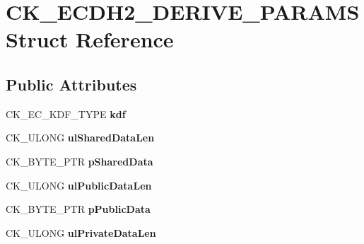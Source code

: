 \hypertarget{struct_c_k___e_c_d_h2___d_e_r_i_v_e___p_a_r_a_m_s}{}\section{C\+K\+\_\+\+E\+C\+D\+H2\+\_\+\+D\+E\+R\+I\+V\+E\+\_\+\+P\+A\+R\+A\+MS Struct Reference}
\label{struct_c_k___e_c_d_h2___d_e_r_i_v_e___p_a_r_a_m_s}
\subsection*{Public Attributes}
\begin{DoxyCompactItemize}
\item 
\mbox{\label{struct_c_k___e_c_d_h2___d_e_r_i_v_e___p_a_r_a_m_s_a202b6935c7bbec17e822dfb2d917c97d}} 
C\+K\+\_\+\+E\+C\+\_\+\+K\+D\+F\+\_\+\+T\+Y\+PE {\bfseries kdf}
\item 
\mbox{\label{struct_c_k___e_c_d_h2___d_e_r_i_v_e___p_a_r_a_m_s_a1a3d627d6ea0d88686f195a19413600f}} 
C\+K\+\_\+\+U\+L\+O\+NG {\bfseries ul\+Shared\+Data\+Len}
\item 
\mbox{\label{struct_c_k___e_c_d_h2___d_e_r_i_v_e___p_a_r_a_m_s_a827b60434454740b0317e9607b080d5d}} 
C\+K\+\_\+\+B\+Y\+T\+E\+\_\+\+P\+TR {\bfseries p\+Shared\+Data}
\item 
\mbox{\label{struct_c_k___e_c_d_h2___d_e_r_i_v_e___p_a_r_a_m_s_a22c377ae785c66b306ee1fe95c29ab47}} 
C\+K\+\_\+\+U\+L\+O\+NG {\bfseries ul\+Public\+Data\+Len}
\item 
\mbox{\label{struct_c_k___e_c_d_h2___d_e_r_i_v_e___p_a_r_a_m_s_ad2b01bb55ad3217666b8ce8fc6ee8f37}} 
C\+K\+\_\+\+B\+Y\+T\+E\+\_\+\+P\+TR {\bfseries p\+Public\+Data}
\item 
\mbox{\label{struct_c_k___e_c_d_h2___d_e_r_i_v_e___p_a_r_a_m_s_a0575282c7a62db5bf69a9be3b216d928}} 
C\+K\+\_\+\+U\+L\+O\+NG {\bfseries ul\+Private\+Data\+Len}

\end{DoxyCompactItemize}
